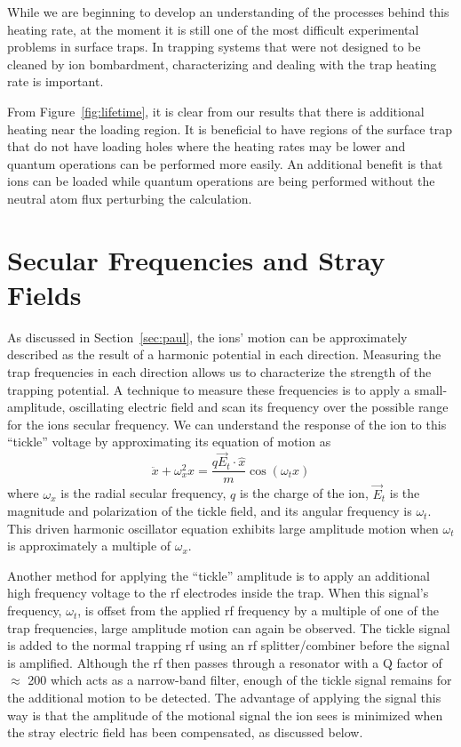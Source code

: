 While we are beginning to develop an understanding of the processes behind this heating rate, at the moment it is still one of the most difficult experimental problems in surface traps.  In trapping systems that were not designed to be cleaned by ion bombardment, characterizing and dealing with the trap heating rate is important.

From Figure~\ref{fig:lifetime}, it is clear from our results that there is additional heating near the loading region.  It is beneficial to have regions of the surface trap that do not have loading holes where the heating rates may be lower and quantum operations can be performed more easily.  An additional benefit is that ions can be loaded while quantum operations are being performed without the neutral atom flux perturbing the calculation.  

\section{Secular Frequencies and Stray Fields}
\label{sec:secfreqs}

As discussed in Section~\ref{sec:paul}, the ions' motion can be approximately described as the result of a harmonic potential in each direction.  Measuring the trap frequencies in each direction allows us to characterize the strength of the trapping potential.  A technique to measure these frequencies is to apply a small-amplitude, oscillating electric field and scan its frequency over the possible range for the ions secular frequency.  We can understand the response of the ion to this ``tickle'' voltage by approximating its equation of motion as
\begin{equation}
	\ddot{x} + \omega_x^2 x = \frac{q \vec{E}_t \cdot \hat{x}}{m} \cos( \omega_t x )
\end{equation}
where $\omega_x$ is the radial secular frequency, $q$ is the charge of the ion, $\vec{E}_t$ is the magnitude and polarization of the tickle field, and its angular frequency is $\omega_t$.  This driven harmonic oscillator equation exhibits large amplitude motion when $\omega_t$ is approximately a multiple of $\omega_x$.

Another method for applying the ``tickle'' amplitude is to apply an additional high frequency voltage to the rf electrodes inside the trap.  When this signal's frequency, $\omega_t$, is offset from the applied rf frequency by a multiple of one of the trap frequencies, large amplitude motion can again be observed.  The tickle signal is added to the normal trapping rf using an rf splitter/combiner before the signal is amplified.  Although the rf then passes through a resonator with a Q factor of $\approx$ 200 which acts as a narrow-band filter, enough of the tickle signal remains for the additional motion to be detected.  The advantage of applying the signal this way is that the amplitude of the motional signal the ion sees is minimized when the stray electric field has been compensated, as discussed below. 


